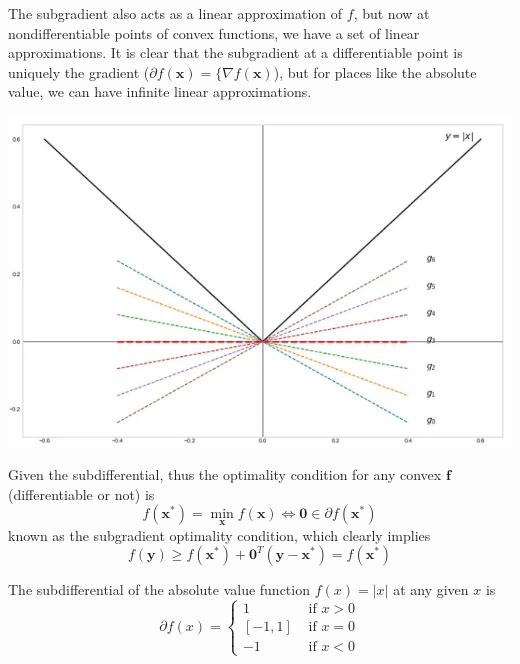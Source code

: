   The subgradient also acts as a linear approximation of $f$, but now at nondifferentiable points of convex functions, we have a set of linear approximations. It is clear that the subgradient at a differentiable point is uniquely the gradient ($\partial f(\mathbf{x}) = \{ \nabla f(\mathbf{x})$), but for places like the absolute value, we can have infinite linear approximations. 
  \begin{center}
    \includegraphics[scale=0.4]{img/subgradient_of_abs.png}
  \end{center}
  Given the subdifferential, thus the optimality condition for any convex $\mathbf{f}$ (differentiable or not) is
  \begin{equation}
    f(\mathbf{x}^\ast) = \min_{\mathbf{x}} f(\mathbf{x}) \iff \mathbf{0} \in \partial f(\mathbf{x}^\ast)
  \end{equation}
  known as the subgradient optimality condition, which clearly implies 
  \begin{equation}
    f(\mathbf{y}) \geq f(\mathbf{x}^\ast) + \mathbf{0}^T (\mathbf{y} - \mathbf{x}^\ast) = f(\mathbf{x}^\ast)
  \end{equation}

  \begin{example}
    The subdifferential of the absolute value function $f(x) = |x|$ at any given $x$ is 
    \begin{equation}
      \partial f(x) = \begin{cases} 1 & \text{ if } x > 0 \\ [-1, 1] & \text{ if } x = 0 \\ -1 & \text{ if } x < 0 \end{cases}
    \end{equation}
  \end{example}

